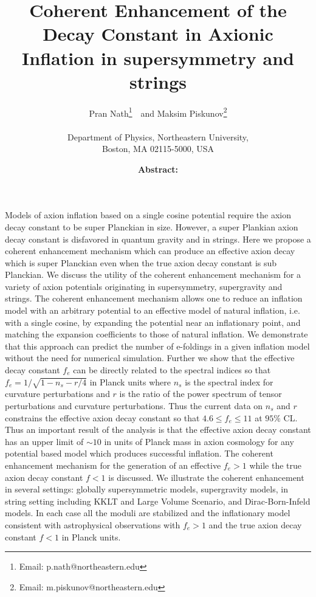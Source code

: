 \documentclass[12pt]{article}
\author{
  Pran Nath\footnote{Email: p.nath@northeastern.edu}~\ and
  Maksim Piskunov\footnote{Email: m.piskunov@northeastern.edu}\\~\\
  Department of Physics, Northeastern University,\\
  Boston, MA 02115-5000, USA
}
\title{
  Coherent Enhancement of the Decay Constant
  in Axionic Inflation in supersymmetry and strings
}
\begin{document}
\maketitle
\date

\textbf{Abstract:}
Models of axion inflation based on a single cosine potential require the axion decay constant to be super Planckian in size.
However, a super Plankian axion decay constant is disfavored in quantum gravity and in strings.
Here we propose a coherent enhancement mechanism which can produce an effective axion decay which is super Planckian even when the true axion decay constant is sub Planckian.
We discuss the utility of the coherent enhancement mechanism for a variety of axion potentials originating in supersymmetry, supergravity and strings.
The coherent enhancement mechanism allows one to reduce an inflation model with an arbitrary potential to an effective model of natural inflation, i.e. with a single cosine, by expanding the potential near an inflationary point, and matching the expansion coefficients to those of natural inflation.
We demonstrate that this approach can predict the number of e-foldings in a given inflation model without the need for numerical simulation.
Further we show that the effective decay constant $f_e$ can be directly related to the spectral indices so that $f_e = 1 / \sqrt{1 - n_s - r / 4}$ in Planck units where $n_s$ is the spectral index for curvature perturbations and $r$ is the ratio of the power spectrum of tensor perturbations and curvature perturbations.
Thus the current data on $n_s$ and $r$ constrains the effective axion decay constant so that $4.6 \leq f_e \leq 11$ at $95\%$ CL.
Thus an important result of the analysis is that the effective axion decay constant has an upper limit of $\sim 10$ in units of Planck mass in axion cosmology for any potential based model which produces successful inflation.
The coherent enhancement mechanism for the generation of an effective $f_e > 1$ while the true axion decay constant $f<1$ is discussed.
We illustrate the coherent enhancement in several settings: globally supersymmetric models, supergravity models, in string setting including KKLT and Large Volume Scenario, and Dirac-Born-Infeld models.
In each case all the moduli are stabilized and the inflationary model consistent with astrophysical observations with $f_e>1$ and the true axion decay constant $f<1$ in Planck units.
\newpage
\end{document}
